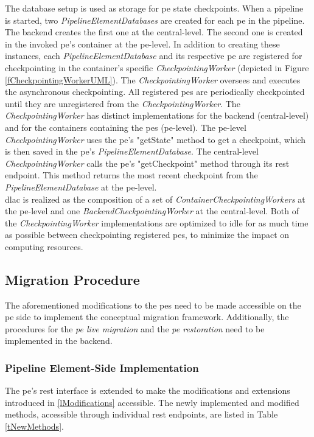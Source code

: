 The database setup is used as storage for \gls{pe} state checkpoints. When a pipeline is started, two \textit{PipelineElementDatabases} are created for each \gls{pe} in the pipeline. The backend creates the first one at the central-level. The second one is created in the invoked \gls{pe}'s container at the \gls{pe}-level. In addition to creating these instances, each \textit{PipelineElementDatabase} and its respective \gls{pe} are registered for checkpointing in the container’s specific \textit{CheckpointingWorker} (depicted in Figure \ref{fCheckpointingWorkerUML}). The \textit{CheckpointingWorker} oversees and executes the asynchronous checkpointing. All registered \gls{pe}s are periodically checkpointed until they are unregistered from the \textit{CheckpointingWorker}. The \textit{CheckpointingWorker} has distinct implementations for the backend (central-level) and for the containers containing the \gls{pe}s (\gls{pe}-level). The \gls{pe}-level \textit{CheckpointingWorker} uses the \gls{pe}'s "getState" method to get a checkpoint, which is then saved in the \gls{pe}'s \textit{PipelineElementDatabase}. The central-level \textit{CheckpointingWorker} calls the \gls{pe}'s "getCheckpoint" method through its \gls{rest} endpoint. This method returns the most recent checkpoint from the \textit{PipelineElementDatabase} at the \gls{pe}-level.\\
\gls{dlac} is realized as the composition of a set of \textit{ContainerCheckpointingWorkers} at the \gls{pe}-level and one \textit{BackendCheckpointingWorker} at the central-level. Both of the \textit{CheckpointingWorker} implementations are optimized to idle for as much time as possible between checkpointing registered \gls{pe}s, to minimize the impact on computing resources.\par





\subsection{Migration Procedure}
\label{lImplementationMigrationProcedure}
The aforementioned modifications to the \gls{pe}s need to be made accessible on the \gls{pe} side to implement the conceptual migration framework. Additionally, the procedures for the \textit{\acrshort{pe} live migration} and the \textit{\acrshort{pe} restoration} need to be implemented in the backend.\par

\subsubsection{Pipeline Element-Side Implementation}
\label{lOperatorSideImplementation}
The \gls{pe}'s \gls{rest} interface is extended to make the modifications and extensions introduced in \ref{lModifications} accessible. The newly implemented and modified methods, accessible through individual \gls{rest} endpoints, are listed in Table \ref{tNewMethods}.


